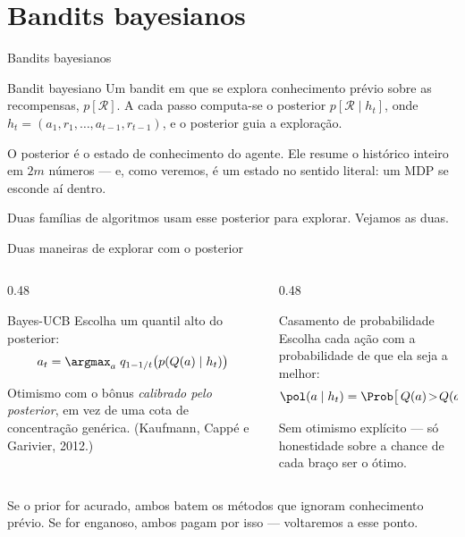 \documentclass[aspectratio=169, 11pt]{beamer}
\newcommand{\hist}{h_t}
\begin{document}
\section{Bandits bayesianos}

\begin{frame}{Bandits bayesianos}
  \begin{defbox}{Bandit bayesiano}
    Um bandit em que se explora conhecimento prévio sobre as recompensas,
    $p[\mathcal{R}]$. A cada passo computa-se o posterior
    $p[\mathcal{R} \mid \hist]$, onde
    $\hist = (a_1, r_1, \ldots, a_{t-1}, r_{t-1})$, e o posterior guia a
    exploração.
  \end{defbox}

  \begin{ideiabox}
    O posterior é o \alert{estado de conhecimento} do agente. Ele resume o
    histórico inteiro em $2m$ números — e, como veremos, é um estado no
    sentido literal: um MDP se esconde aí dentro.
  \end{ideiabox}

  \medskip
  {\small\color{rlCinza} Duas famílias de algoritmos usam esse posterior
  para explorar. Vejamos as duas.}
\end{frame}

\begin{frame}{Duas maneiras de explorar com o posterior}
  \begin{columns}[T]
    \begin{column}{0.48\textwidth}
      \begin{teobox}{Bayes-UCB}
        Escolha um quantil alto do posterior:
        \[ a_t = \argmax_{a} \; q_{1 - 1/t}\big(p(Q(a) \mid \hist)\big) \]
        \vspace{-1.2em}

        Otimismo com o bônus \emph{calibrado pelo posterior}, em vez de
        uma cota de concentração genérica.
        {\scriptsize (Kaufmann, Cappé e Garivier, 2012.)}
      \end{teobox}
    \end{column}
    \begin{column}{0.48\textwidth}
      \begin{teobox}{Casamento de probabilidade}
        Escolha cada ação com a probabilidade de que ela seja a melhor:
        \[ \pol(a \mid \hist) = \Prob\big[\,Q(a) \!>\! Q(a')\ \forall a'\neq a \mid \hist\,\big] \]
        \vspace{-1.2em}

        Sem otimismo explícito — só honestidade sobre a chance de cada
        braço ser o ótimo.
      \end{teobox}
    \end{column}
  \end{columns}

  \medskip
  {\small\color{rlCinza} Se o prior for acurado, ambos batem os métodos
  que ignoram conhecimento prévio. Se for enganoso, ambos pagam por isso —
  voltaremos a esse ponto.}
\end{frame}
\end{document}
